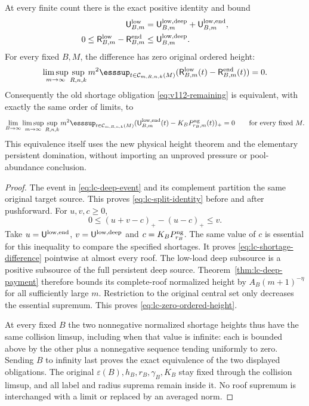 \begin{theorem}
\label{thm:lc-same-pool}
At every finite count there is the exact positive identity and bound
\begin{align}
 \mathsf U_{B,m}^{\rm low}
    &=\mathsf U_{B,m}^{\rm low,deep}
                             +\mathsf U_{B,m}^{\rm low,end},
                                                 \label{eq:lc-split-identity}\\
 0\le\mathsf R_{B,m}^{\rm low}-\mathsf R_{B,m}^{\rm end}
    &\le\mathsf U_{B,m}^{\rm low,deep}.
                                                 \label{eq:lc-shortage-difference}
\end{align}
For every fixed $B,M$, the difference has zero original ordered
height:
\begin{equation}\label{eq:lc-zero-ordered-height}
 \limsup_{m\to\infty}\sup_{R,n,k}m^2
 \esssup_{t\in\mathcal C_{m,R,n,k}(M)}
 (\mathsf R_{B,m}^{\rm low}(t)-\mathsf R_{B,m}^{\rm end}(t))=0.
\end{equation}
Consequently the old shortage obligation \eqref{eq:v112-remaining}
is equivalent, with exactly the same order of limits, to
\begin{equation}\label{eq:lc-final-shortage}
 \lim_{B\to\infty}\limsup_{m\to\infty}\sup_{R,n,k}m^2
 \esssup_{t\in\mathcal C_{m,R,n,k}(M)}
 (\mathsf U_{B,m}^{\rm low,end}(t)-K_BP_{r_B,m}^{\rm ng}(t))_+=0
 \qquad\hbox{for every fixed }M.
\end{equation}
This equivalence itself uses the new physical height theorem and
the elementary persistent domination, without importing an
unproved pressure or pool-abundance conclusion.
\end{theorem}
\begin{proof}
The event in \eqref{eq:lc-deep-event} and its complement partition
the same original target source.  This proves
\eqref{eq:lc-split-identity} before and after pushforward.  For
$u,v,c\ge0$,
\[
                  0\le(u+v-c)_+-(u-c)_+\le v.
\]
Take $u=\mathsf U^{\rm low,end}$,
$v=\mathsf U^{\rm low,deep}$ and
$c=K_BP_{r_B}^{\rm ng}$.  The same value of $c$ is essential for
this inequality to compare the specified shortages.  It proves
\eqref{eq:lc-shortage-difference} pointwise at almost every roof.
The low-load deep subsource is a positive subsource of the full
persistent deep source.  Theorem~\ref{thm:lc-deep-payment} therefore
bounds its complete-roof normalized height by
$A_B(m+1)^{-\eta}$ for all sufficiently large $m$.  Restriction
to the original central set only decreases the essential supremum.
This proves \eqref{eq:lc-zero-ordered-height}.

At every fixed $B$ the two nonnegative normalized shortage heights
thus have the same collision limsup, including when that value is
infinite: each is bounded above by the other plus a nonnegative
sequence tending uniformly to zero.  Sending $B$ to infinity last
proves the exact equivalence of the two displayed obligations.
The original $\varepsilon(B),h_B,r_B,\gamma_B,K_B$ stay fixed
through the collision limsup, and all label and radius suprema
remain inside it.  No roof supremum is interchanged with a
limit or replaced by an averaged norm.
\end{proof}

